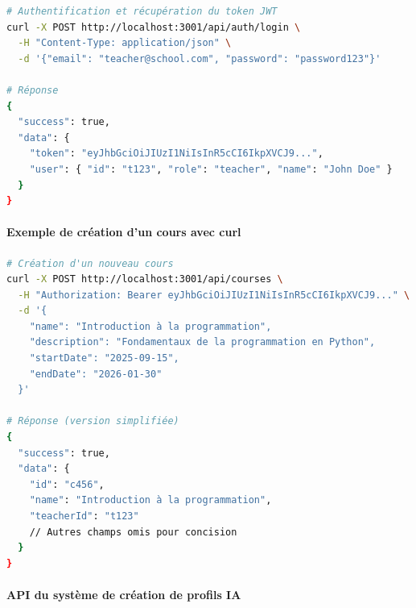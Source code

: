 \begin{lstlisting}[style=codestyle, language=bash]
# Authentification et récupération du token JWT
curl -X POST http://localhost:3001/api/auth/login \
  -H "Content-Type: application/json" \
  -d '{"email": "teacher@school.com", "password": "password123"}'

# Réponse
{
  "success": true,
  "data": {
    "token": "eyJhbGciOiJIUzI1NiIsInR5cCI6IkpXVCJ9...",
    "user": { "id": "t123", "role": "teacher", "name": "John Doe" }
  }
}
\end{lstlisting}

\paragraph{Exemple de création d'un cours avec curl}

\begin{lstlisting}[style=codestyle, language=bash]
# Création d'un nouveau cours
curl -X POST http://localhost:3001/api/courses \
  -H "Authorization: Bearer eyJhbGciOiJIUzI1NiIsInR5cCI6IkpXVCJ9..." \
  -d '{
    "name": "Introduction à la programmation",
    "description": "Fondamentaux de la programmation en Python",
    "startDate": "2025-09-15",
    "endDate": "2026-01-30"
  }'

# Réponse (version simplifiée)
{
  "success": true,
  "data": {
    "id": "c456",
    "name": "Introduction à la programmation",
    "teacherId": "t123"
    // Autres champs omis pour concision
  }
}
\end{lstlisting}

\paragraph{API du système de création de profils IA}

